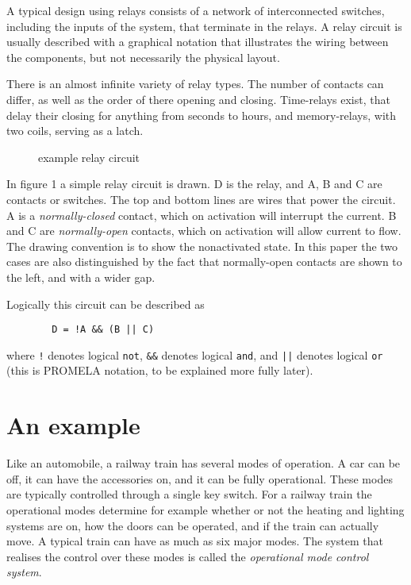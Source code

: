 A typical design using relays consists of a network of interconnected switches, including the
inputs of the system, that terminate in the relays.
A relay circuit is usually described with a graphical notation that illustrates the
wiring between the components, but not necessarily the physical layout.

There is an almost infinite variety of relay types.
The number of contacts can differ, as well as the
order of there opening and closing. Time-relays exist, that delay their closing for
anything from seconds to  hours, and memory-relays, with two coils, serving as a latch.
\begin{figure}
\epsfxsize=150pt 
\centerline{}
\caption{example relay circuit}
\end{figure}



In figure 1 a simple relay circuit is drawn. D is the relay, and A, B and C are contacts or
switches.
The top and bottom lines are wires that power the circuit.
A is a {\em normally-closed} contact, which on activation will interrupt the current. B and C are
{\em normally-open} contacts, which on activation will allow current to flow. The drawing
convention is to show the nonactivated state. In this paper the two cases are also
distinguished by the fact that normally-open contacts are shown to the left, and with a wider
gap.

Logically this circuit can be described as 

\begin{verbatim}
        D = !A && (B || C)
\end{verbatim}

where {\tt !} denotes logical {\tt not}, {\tt \&\&} denotes logical {\tt and},
and {\tt ||} denotes logical {\tt or} (this is PROMELA notation,
 to be explained more fully later).

\section{An example}

Like an automobile, a railway train has several modes of operation.
A car can be off, it can have the accessories on, and it can be fully operational.
These modes are typically controlled through a single key switch.
For a railway train the operational modes determine for example
whether or not the heating and lighting
systems are on, how the doors can be operated, and if the train can actually move. A
typical train can have as much as six major modes.
The system that realises the control over these modes is called the {\em operational mode
control system}.

